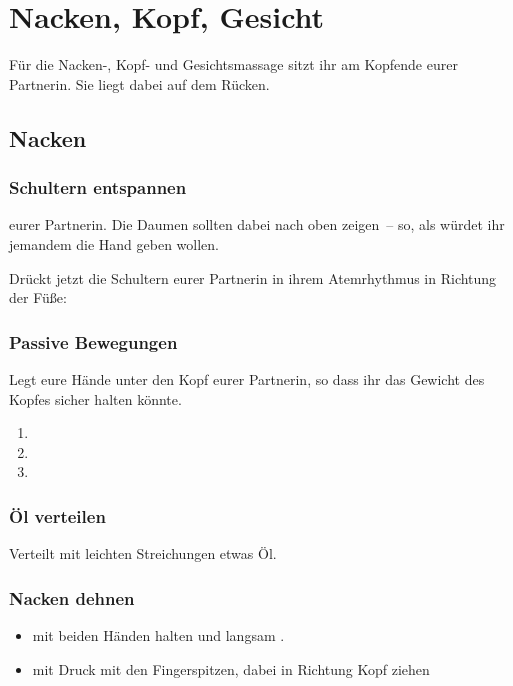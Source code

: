 \section{Nacken, Kopf, Gesicht}

Für die Nacken-, Kopf- und Gesichtsmassage sitzt ihr am Kopfende eurer Partnerin. Sie liegt dabei auf dem Rücken.

\subsection{Nacken}

\subsubsection{Schultern entspannen}
 eurer Partnerin. Die Daumen sollten dabei nach oben zeigen~-- so, als würdet ihr jemandem die Hand geben wollen.

Drückt jetzt die Schultern eurer Partnerin in ihrem Atemrhythmus in Richtung der Füße: 

\subsubsection{Passive Bewegungen}

Legt eure Hände unter den Kopf eurer Partnerin, so dass ihr das Gewicht des Kopfes sicher halten könnte.

\begin{enumerate}
	\item {}
	\item {}
	\item {}
\end{enumerate}

\subsubsection{Öl verteilen}

Verteilt mit leichten Streichungen etwas Öl.

\subsubsection{Nacken dehnen}
\begin{itemize}
	\item {} mit beiden Händen halten und langsam .
	\item {} mit Druck mit den Fingerspitzen, dabei in Richtung Kopf ziehen
\end{itemize}

